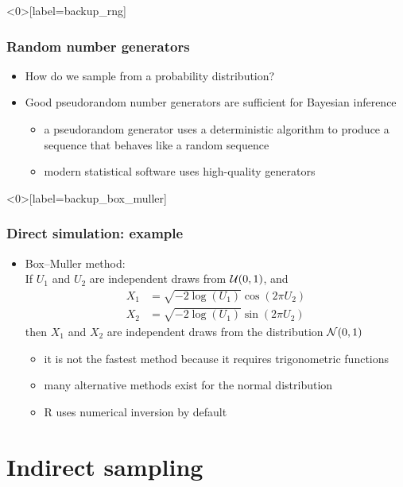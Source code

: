 \documentclass[10pt]{beamer}
\begin{document}
\begin{frame}<0>[label=backup_rng]

\frametitle{Random number generators}

  \begin{itemize}
  \item {\color{uured}How do we sample from a probability distribution?}
  \pause
  \item Good {\color{uured}pseudorandom} number generators are sufficient
    for Bayesian inference
  \begin{itemize}
    \item a pseudorandom generator uses a deterministic algorithm to
      produce a sequence that behaves like a random sequence
    \item modern statistical software uses high-quality generators
    \end{itemize}
  \end{itemize}

\end{frame}

\begin{frame}<0>[label=backup_box_muller]


\frametitle{Direct simulation: example}

  \begin{itemize}
  \item Box--Muller method:\\ If $U_1$ and $U_2$ are independent
    draws from $\mathcal{U}(0,1)$, and
    \begin{align*}
      X_1 & = \sqrt{-2\log(U_1)}\cos(2\pi U_2) \\
      X_2 & = \sqrt{-2\log(U_1)}\sin(2\pi U_2)
    \end{align*}
    then $X_1$ and $X_2$ are independent draws from the distribution
    $\mathcal{N}(0,1)$
    \pause
    \begin{itemize}
      \item it is not the fastest method because it requires trigonometric functions
      \item many alternative methods exist for the normal distribution
      \item R uses numerical inversion by default
    \end{itemize}
  \end{itemize}

\end{frame}

\section{Indirect sampling}
\frame{\sectionpage}
\end{document}
